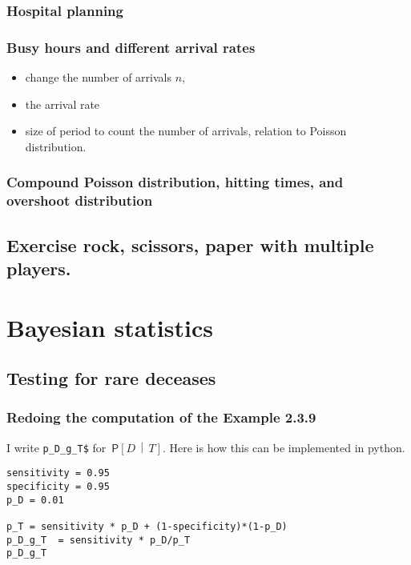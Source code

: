 \documentclass[a4paper]{article}
\theoremstyle{definition}
\newcommand{\given}{\,\middle|\,}
\renewcommand{\P}[1]{\,\mathsf{P}\left[#1\right]}
\newcommand{\1}[1]{\,I_{#1}} %
\begin{document}
\subsubsection{Hospital planning}
\label{sec:org797c22e}

\subsubsection{Busy hours and different arrival rates}
\label{sec:org67a19a4}


\begin{itemize}
\item change the number of arrivals \(n\),
\item the arrival rate
\item size of period to count the number of arrivals, relation to Poisson distribution.
\end{itemize}




\subsubsection{Compound Poisson distribution, hitting times, and overshoot distribution}
\label{sec:org0740c9c}


\subsection{Exercise rock, scissors, paper with multiple players.}
\label{sec:org351adb7}



\section{Bayesian statistics}
\label{sec:org1f4616c}

\subsection{Testing for rare deceases}
\label{sec:orgb704f64}

\subsubsection{Redoing the  computation of the  Example 2.3.9}
\label{sec:orge3a48cf}

I write \texttt{p\_D\_g\_T\$} for \(\P{D\given T}\). Here is how this can be implemented in python.

\begin{verbatim}
sensitivity = 0.95
specificity = 0.95
p_D = 0.01

p_T = sensitivity * p_D + (1-specificity)*(1-p_D)
p_D_g_T  = sensitivity * p_D/p_T
p_D_g_T
\end{verbatim}
\end{document}

